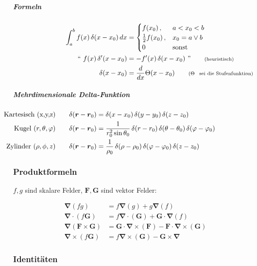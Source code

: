 \documentclass[titlepage,11pt,a4paper,ngerman]{report}
\renewcommand{\vec}[1]{\boldsymbol{#1}}
\newcommand{\vabla}{\boldsymbol{\nabla}}
\renewcommand{\paragraph}[1]{\subsubsection{#1}}
\begin{document}
\subparagraph{Formeln}
\begin{align*}
\int_{a}^{b} f(x) \, \delta (x-x_0) \, dx &= 
	\begin{cases}
		f(x_0) \, , & a < x_0 < b \\
		\frac{1}{2} f(x_0) \, , & x_0 = a \lor b \\
		0 \, & \text{sonst}
	\end{cases} \\
`` \ f(x) \, \delta '(x-x_0) &= -f'(x) \, \delta (x-x_0) \ " \qquad \rlap{\text{\scriptsize{(heuristisch)}}} \\
\delta (x - x_0) &= \frac{d}{dx} \Theta (x - x_0) \qquad \rlap{\scriptsize{($ \Theta $ \, \text{sei die Stufenfunktion)}}}
\end{align*} 

\subparagraph{Mehrdimensionale Delta-Funktion}
\begin{align*}
\llap{\text{Kartesisch (x,y,z)}} \qquad \delta(\vec{r} - \vec{r}_0) &= \delta(x - x_0) \, \delta(y - y_0) \, \delta(z - z_0) \\
\llap{\text{Kugel $ (r, \theta, \varphi) $}} \qquad \delta(\vec{r} - \vec{r}_0) &= \frac{1}{r^2_0 \sin\theta_0} \, \delta(r - r_0) \, \delta(\theta - \theta _0) \, \delta(\varphi - \varphi _0) \\
\llap{\text{Zylinder $ (\rho , \phi , z) $}} \qquad \delta(\vec{r} - \vec{r}_0) &= \frac{1}{\rho _0} \, \delta(\rho - \rho _0) \, \delta(\varphi - \varphi _0) \, \delta(z - z _0)
\end{align*}

\paragraph{Produktformeln}
$f, g$ sind skalare Felder, $\vec{F}, \vec{G}$ sind vektor Felder:

\begin{align*}
 	\vabla(fg) &= f \vabla (g) + g \vabla (f)\\
 	\vabla \cdot (f \vec{G}) &= f \vabla \cdot (\vec{G}) + \vec{G} \cdot \vabla (f)\\
 	\vabla (\vec{F} \times \vec{G}) &= \vec{G} \cdot \vabla \times (\vec{F}) - \vec{F} \cdot \vabla \times (\vec{G})\\
 	\vabla \times (f \vec{G}) &= f \vabla \times (\vec{G}) - \vec{G} \times \vabla
\end{align*}

\paragraph{Identitäten}
\end{document}
